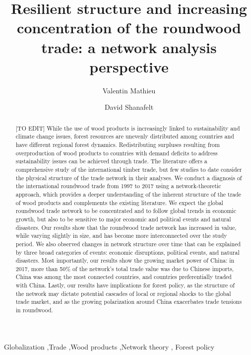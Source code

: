 \documentclass[
  authoryear,
  review,
  3p]{elsarticle}
\begin{document}
\begin{frontmatter}
\title{Resilient structure and increasing concentration of the roundwood
trade: a network analysis perspective}
\author[1,2]{Valentin Mathieu%
%
}
\author[2]{David Shanafelt%
%
}




        
\begin{abstract}
{[}TO EDIT{]} While the use of wood products is increasingly linked to
sustainability and climate change issues, forest resources are unevenly
distributed among countries and have different regional forest dynamics.
Redistributing surpluses resulting from overproduction of wood products
to countries with demand deficits to address sustainability issues can
be achieved through trade. The literature offers a comprehensive study
of the international timber trade, but few studies to date consider the
physical structure of the trade network in their analyses. We conduct a
diagnosis of the international roundwood trade from 1997 to 2017 using a
network-theoretic approach, which provides a deeper understanding of the
inherent structure of the trade of wood products and complements the
existing literature. We expect the global roundwood trade network to be
concentrated and to follow global trends in economic growth, but also to
be sensitive to major economic and political events and natural
disasters. Our results show that the roundwood trade network has
increased in value, while varying slightly in size, and has become more
interconnected over the study period. We also observed changes in
network structure over time that can be explained by three broad
categories of events: economic disruptions, political events, and
natural disasters. Most importantly, our results show the growing market
power of China: in 2017, more than 50\% of the network's total trade
value was due to Chinese imports, China was among the most connected
countries, and countries preferentially traded with China. Lastly, our
results have implications for forest policy, as the structure of the
network may dictate potential cascades of local or regional shocks to
the global trade market, and as the growing polarization around China
exacerbates trade tensions in roundwood.
\end{abstract}





\begin{keyword}
    Globalization \sep Trade \sep Wood products \sep Network
theory \sep 
    Forest policy
\end{keyword}
\end{frontmatter}
    
\end{document}
